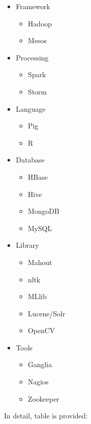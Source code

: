 \documentclass[9pt,twocolumn,twoside]{styles/osajnl}
\begin{document}
\begin{itemize}
\item Framework
\begin{itemize}
   \item Hadoop
   \item Mesos
\end{itemize}
\item Processing
\begin{itemize}
   \item Spark
   \item Storm
\end{itemize}
\item Language
\begin{itemize}
   \item Pig
   \item R
\end{itemize}
\item Database
\begin{itemize}
   \item HBase
   \item Hive
   \item MongoDB
   \item MySQL
\end{itemize}
\item Library
\begin{itemize}
   \item Mahout
   \item nltk
   \item MLlib
   \item Lucene/Solr
   \item OpenCV
\end{itemize}
\item Tools
\begin{itemize}
   \item Ganglia
   \item Nagios
   \item Zookeeper
\end{itemize}
\end{itemize}


In detail, table is provided:
\end{document}
